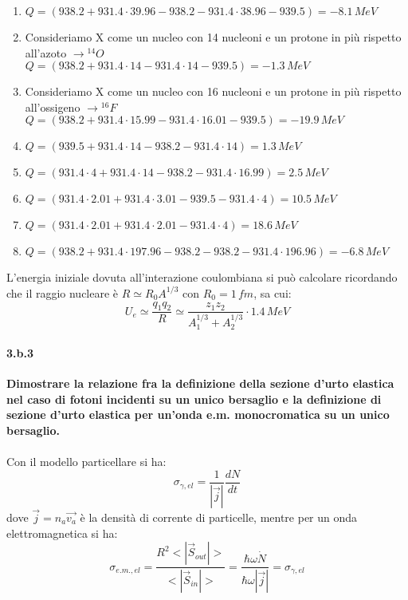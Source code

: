 \documentclass[twoside]{article}
\begin{document}
\begin{enumerate}
    \item $Q=(938.2+931.4\cdot39.96-938.2-931.4\cdot38.96-939.5)=-8.1\,MeV$\\
    \item Consideriamo X come un nucleo con 14 nucleoni e un protone in più rispetto all'azoto $\rightarrow{}^{14}O$\\ $Q=(938.2+931.4\cdot14-931.4\cdot14-939.5)=-1.3\,MeV$\\
    \item Consideriamo X come un nucleo con 16 nucleoni e un protone in più rispetto all'ossigeno $\rightarrow{}^{16}F$\\ $Q=(938.2+931.4\cdot15.99-931.4\cdot16.01-939.5)=-19.9\,MeV$\\
    \item $Q=(939.5+931.4\cdot14-938.2-931.4\cdot14)=1.3\,MeV$\\
    \item $Q=(931.4\cdot4+931.4\cdot14-938.2-931.4\cdot16.99)=2.5\,MeV$\\
    \item $Q=(931.4\cdot2.01+931.4\cdot3.01-939.5-931.4\cdot4)=10.5\,MeV$\\
    \item $Q=(931.4\cdot2.01+931.4\cdot2.01-931.4\cdot4)=18.6\,MeV$\\
    \item $Q=(938.2+931.4\cdot197.96-938.2-938.2-931.4\cdot196.96)=-6.8\,MeV$\\
\end{enumerate}
L'energia iniziale dovuta all'interazione coulombiana si può calcolare ricordando che il raggio nucleare è $R\simeq R_0A^{1/3}$ con $R_0=1\,fm$, sa cui:
\begin{equation}
    U_e\simeq\frac{q_1q_2}{R}\simeq\frac{z_1z_2}{A_1^{1/3}+A_2^{1/3}}\cdot1.4\, MeV
\end{equation}
\paragraph{3.b.3}\textbf{Dimostrare la relazione fra la definizione della sezione d’urto elastica nel caso di fotoni incidenti su un unico bersaglio e la definizione di sezione d'urto elastica per un’onda e.m. monocromatica su un unico bersaglio.}\\
\\
Con il modello particellare si ha:
\begin{equation}
    \sigma_{\gamma,el}=\frac{1}{|\vec{j}|}\frac{dN}{dt}
\end{equation}
dove $\vec{j}=n_a\vec{v_a}$ è la densità di corrente di particelle, mentre per un onda elettromagnetica si ha:
\begin{equation}
    \sigma_{e.m.,el}=\frac{R^2<|\vec{S}_{out}|>}{<|\vec{S}_{in}|>}=\frac{\hbar\omega\dot{N}}{\hbar\omega|\vec{j}|}=\sigma_{\gamma,el}
\end{equation}
\end{document}
